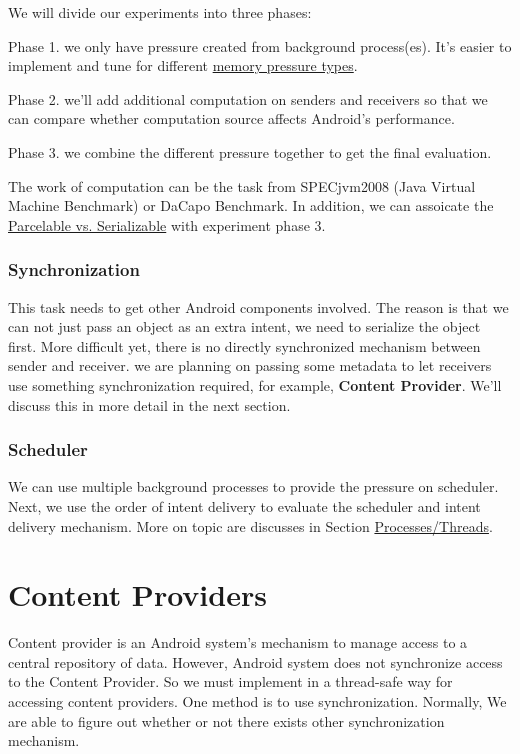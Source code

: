 \documentclass[11pt]{article}
\begin{document}
We will divide our experiments into three phases:

Phase 1. we only have pressure created from background process(es).
It's easier to implement and tune for different \hyperref[Memory-Pressure-Types]{memory pressure types}.

Phase 2. we'll add additional computation on senders and receivers so that we can compare
whether computation source affects Android's performance.

Phase 3. we combine the different pressure together to get the final evaluation.

The work of computation can be the task from SPECjvm2008 (Java Virtual Machine Benchmark) or DaCapo Benchmark.
In addition, we can assoicate the \hyperref[Parcelable/Serializable]{Parcelable vs. Serializable} with experiment phase 3.

\subsubsection{Synchronization}
\label{sec-3-2-2}
This task needs to get other Android components involved.
The reason is that we can not just pass an object as an extra intent, we need to serialize the object first.
More difficult yet, there is no directly synchronized mechanism between sender and receiver.
we are planning on passing some metadata to let receivers use something synchronization required, for example, \textbf{Content Provider}. We'll discuss this in more detail in the next section.

\subsubsection{Scheduler}
\label{sec-3-2-3}
We can use multiple background processes to provide the pressure on scheduler.
Next, we use the order of intent delivery to evaluate the scheduler and intent delivery mechanism. More on topic are discusses in Section \hyperref[Processes/Threads]{Processes/Threads}.

\section{Content Providers}
\label{sec-4}
Content provider is an Android system's mechanism to manage access to a central repository of data.
However, Android system does not synchronize access to the Content Provider.
So we must implement in a thread-safe way for accessing content providers.
One method is to use synchronization. Normally, We are able to figure out whether or not there exists other synchronization mechanism.
\end{document}
